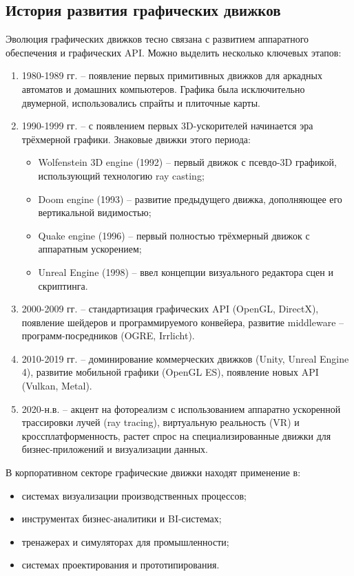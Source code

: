 \subsection{История развития графических движков}

Эволюция графических движков тесно связана с развитием аппаратного обеспечения и графических API. Можно выделить несколько ключевых этапов:

\begin{enumerate}
    \item 1980-1989 гг. -- появление первых примитивных движков для аркадных автоматов и домашних компьютеров. Графика была исключительно двумерной, использовались спрайты и плиточные карты.
    \item 1990-1999 гг. -- с появлением первых 3D-ускорителей начинается эра трёхмерной графики. Знаковые движки этого периода:
    \begin{itemize}[itemindent=\parindent,leftmargin=\parindent]
        \item Wolfenstein 3D engine (1992) -- первый движок с псевдо-3D графикой, использующий технологию ray casting;
        \item Doom engine (1993) -- развитие предыдущего движка, дополняющее его вертикальной видимостью;
        \item Quake engine (1996) -- первый полностью трёхмерный движок с аппаратным ускорением;
        \item Unreal Engine (1998) -- ввел концепции визуального редактора сцен и скриптинга.
    \end{itemize}
    \item 2000-2009 гг. -- стандартизация графических API (OpenGL, DirectX), появление шейдеров и программируемого конвейера, развитие middleware -- программ-посредников (OGRE, Irrlicht).
    \item 2010-2019 гг. -- доминирование коммерческих движков (Unity, Unreal Engine 4), развитие мобильной графики (OpenGL ES), появление новых API (Vulkan, Metal).
    \item 2020-н.в. -- акцент на фотореализм с использованием аппаратно ускоренной трассировки лучей (ray tracing), виртуальную реальность (VR) и кроссплатформенность, растет спрос на специализированные движки для бизнес-приложений и визуализации данных.
\end{enumerate}

В корпоративном секторе графические движки находят применение в:
\begin{itemize}
    \item системах визуализации производственных процессов;
    \item инструментах бизнес-аналитики и BI-системах;
    \item тренажерах и симуляторах для промышленности;
    \item системах проектирования и прототипирования.
\end{itemize}

